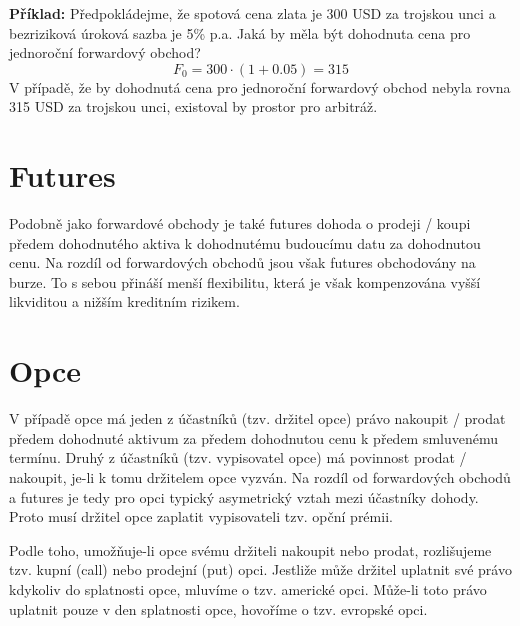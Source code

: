 \documentclass[a4paper]{book}
\begin{document}
\noindent \textbf{Příklad:} Předpokládejme, že spotová cena zlata je 300 USD za trojskou unci a bezriziková úroková sazba je 5\% p.a. Jaká by měla být dohodnuta cena pro jednoroční forwardový obchod?
\begin{equation*}
F_0 = 300 \cdot (1 + 0.05) = 315
\end{equation*}
V případě, že by dohodnutá cena pro jednoroční forwardový obchod nebyla rovna 315 USD za trojskou unci, existoval by prostor pro arbitráž.

\section{Futures}

Podobně jako forwardové obchody je také futures dohoda o prodeji / koupi předem dohodnutého aktiva k dohodnutému budoucímu datu za dohodnutou cenu. Na rozdíl od forwardových obchodů jsou však futures obchodovány na burze. To s sebou přináší menší flexibilitu, která je však kompenzována vyšší likviditou a nižším kreditním rizikem.

\section{Opce}

V případě opce má jeden z účastníků (tzv. držitel opce) právo nakoupit / prodat předem dohodnuté aktivum za předem dohodnutou cenu k předem smluvenému termínu. Druhý z účastníků (tzv. vypisovatel opce) má povinnost prodat / nakoupit, je-li k tomu držitelem opce vyzván. Na rozdíl od forwardových obchodů a futures je tedy pro opci typický asymetrický vztah mezi účastníky dohody. Proto musí držitel opce zaplatit vypisovateli tzv. opční prémii.

Podle toho, umožňuje-li opce svému držiteli nakoupit nebo prodat, rozlišujeme tzv. kupní (call) nebo prodejní (put) opci. Jestliže může držitel uplatnit své právo kdykoliv do splatnosti opce, mluvíme o tzv. americké opci. Může-li toto právo uplatnit pouze v den splatnosti opce, hovoříme o tzv. evropské opci.\\
\end{document}
